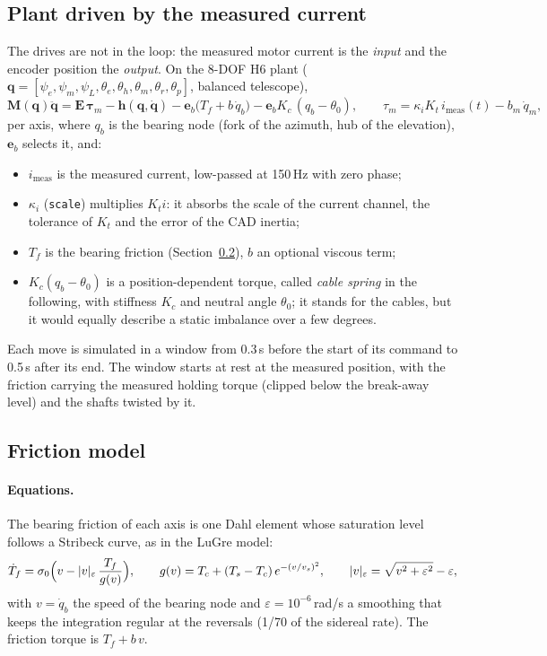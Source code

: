 \documentclass[10pt,a4paper]{article}
\numberwithin{equation}{section}
\begin{document}
\subsection{Plant driven by the measured current}
The drives are not in the loop: the measured motor current is the \emph{input} and the encoder position the \emph{output}. On the 8-DOF H6 plant ($\mathbf q=[\psi_e,\psi_m,\psi_L,\theta_e,\theta_h,\theta_m,\theta_r,\theta_p]$, balanced telescope),
\begin{equation}
\mathbf M(\mathbf q)\ddot{\mathbf q}=\mathbf E\,\bm\tau_m-\mathbf h(\mathbf q,\dot{\mathbf q})-\mathbf e_b\bigl(T_f+b\,\dot q_b\bigr)-\mathbf e_b K_c\,(q_b-\theta_0),
\qquad \tau_m=\kappa_i K_t\,i_\mathrm{meas}(t)-b_m\,\dot q_m ,\label{eq:plant}
\end{equation}
per axis, where $q_b$ is the bearing node (fork of the azimuth, hub of the elevation), $\mathbf e_b$ selects it, and:
\begin{itemize}
\item $i_\mathrm{meas}$ is the measured current, low-passed at 150\,Hz with zero phase;
\item $\kappa_i$ (\texttt{scale}) multiplies $K_t i$: it absorbs the scale of the current channel, the tolerance of $K_t$ and the error of the CAD inertia;
\item $T_f$ is the bearing friction (Section~\ref{sec:friction}), $b$ an optional viscous term;
\item $K_c(q_b-\theta_0)$ is a position-dependent torque, called \emph{cable spring} in the following, with stiffness $K_c$ and neutral angle $\theta_0$; it stands for the cables, but it would equally describe a static imbalance over a few degrees.
\end{itemize}
Each move is simulated in a window from 0.3\,s before the start of its command to 0.5\,s after its end. The window starts at rest at the measured position, with the friction carrying the measured holding torque (clipped below the break-away level) and the shafts twisted by it.

\subsection{Friction model}\label{sec:friction}
\paragraph{Equations.} The bearing friction of each axis is one Dahl element whose saturation level follows a Stribeck curve, as in the LuGre model:
\begin{equation}
\dot T_f=\sigma_0\Bigl(v-|v|_\varepsilon\,\frac{T_f}{g(v)}\Bigr),\qquad
g(v)=T_c+(T_s-T_c)\,e^{-(v/v_s)^2},\qquad |v|_\varepsilon=\sqrt{v^2+\varepsilon^2}-\varepsilon ,\label{eq:dahl}
\end{equation}
with $v=\dot q_b$ the speed of the bearing node and $\varepsilon=10^{-6}$\,rad/s a smoothing that keeps the integration regular at the reversals (1/70 of the sidereal rate). The friction torque is $T_f+b\,v$.
\end{document}
